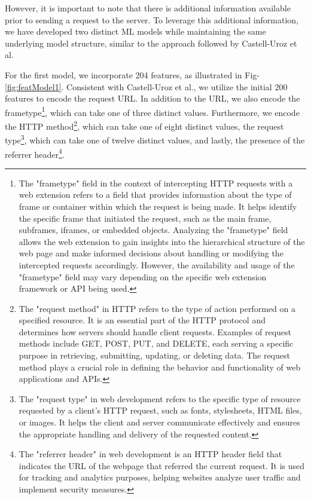 However, it is important to note that there is additional information available prior to sending a request to the server.
To leverage this additional information, we have developed two distinct ML models while maintaining
the same underlying model structure, similar to the approach followed by Castell-Uroz et al.

For the first model, we incorporate 204 features, as illustrated in Fig-\ref{fig:featModel1}. Consistent with Castell-Uroz et al.,
we utilize the initial 200 features to encode the request URL. In addition to the URL, we also encode the frametype\footnote{The "frametype" field in the context of intercepting HTTP requests with a web extension refers to a field that provides information about the type of frame or container within which the request is being made. It helps identify the specific frame that initiated the request, such as the main frame, subframes, iframes, or embedded objects. Analyzing the "frametype" field allows the web extension to gain insights into the hierarchical structure of the web page and make informed decisions about handling or modifying the intercepted requests accordingly. However, the availability and usage of the "frametype" field may vary depending on the specific web extension framework or API being used.},
which can take one of three distinct values. Furthermore, we encode the HTTP method\footnote{The "request method" in HTTP refers to the type of action performed on a specified resource. It is an essential part of the HTTP protocol and determines how servers should handle client requests. Examples of request methods include GET, POST, PUT, and DELETE, each serving a specific purpose in retrieving, submitting, updating, or deleting data. The request method plays a crucial role in defining the behavior and functionality of web applications and APIs.}, which can take
one of eight distinct values, the request type\footnote{The "request type" in web development refers to the specific type of resource requested by a client's HTTP request, such as fonts, stylesheets, HTML files, or images. It helps the client and server communicate effectively and ensures the appropriate handling and delivery of the requested content.}, which can take one of twelve distinct values,
and lastly, the presence of the referrer header\footnote{The "referrer header" in web development is an HTTP header field that indicates the URL of the webpage that referred the current request. It is used for tracking and analytics purposes, helping websites analyze user traffic and implement security measures.}.

